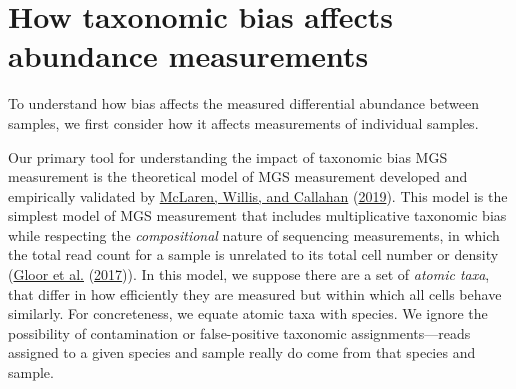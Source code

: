 \documentclass[
]{article}
\theoremstyle{definition}
\theoremstyle{definition}
\theoremstyle{definition}
\theoremstyle{definition}
\theoremstyle{remark}
\begin{document}
\hypertarget{abundance-measurement}{%
\section{How taxonomic bias affects abundance measurements}\label{abundance-measurement}}

To understand how bias affects the measured differential abundance between samples, we first consider how it affects measurements of individual samples.

Our primary tool for understanding the impact of taxonomic bias MGS measurement is the theoretical model of MGS measurement developed and empirically validated by \protect\hyperlink{ref-mclaren2019cons}{McLaren, Willis, and Callahan} (\protect\hyperlink{ref-mclaren2019cons}{2019}).
This model is the simplest model of MGS measurement that includes multiplicative taxonomic bias while respecting the \emph{compositional} nature of sequencing measurements, in which the total read count for a sample is unrelated to its total cell number or density (\protect\hyperlink{ref-gloor2017micr}{Gloor et al.} (\protect\hyperlink{ref-gloor2017micr}{2017})).
In this model, we suppose there are a set of \emph{atomic taxa}, that differ in how efficiently they are measured but within which all cells behave similarly.
For concreteness, we equate atomic taxa with species.
We ignore the possibility of contamination or false-positive taxonomic assignments---reads assigned to a given species and sample really do come from that species and sample.
\end{document}
